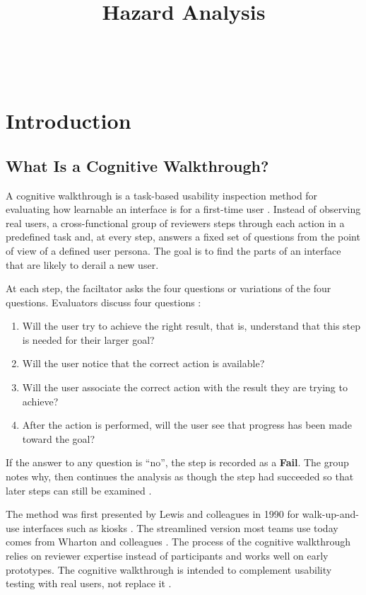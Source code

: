 \documentclass{article}
\title{Hazard Analysis\\\progname}
\author{\authname}
\date{}
\newcommand{\fail}{{\textbf{Fail}}}
\begin{document}
\maketitle
\thispagestyle{empty}

~\newpage
\tableofcontents
\newpage
\section{Introduction}

\subsection{What Is a Cognitive Walkthrough?}

A cognitive walkthrough is a task-based usability inspection method for evaluating how 
learnable an interface is for a first-time user \cite{nng-overview}. Instead of observing 
real users, a cross-functional group of reviewers steps through each action in a predefined 
task and, at every step, answers a fixed set of questions from the point of view of a 
defined user persona. The goal is to find the parts of an interface that are likely 
to derail a new user.

At each step, the faciltator asks the four questions or variations of the four questions. 
Evaluators discuss four questions \cite{nng-overview,nng-workshop}:
\begin{enumerate}
  \item Will the user try to achieve the right result, that is, understand that this step 
  is needed for their larger goal?
  \item Will the user notice that the correct action is available?
  \item Will the user associate the correct action with the result they are trying to 
  achieve?
  \item After the action is performed, will the user see that progress has been made 
  toward the goal?
\end{enumerate}
If the answer to any question is ``no'', the step is recorded as a \fail{}. The group notes 
why, then continues the analysis as though the step had succeeded so that later steps can 
still be examined \cite{nng-workshop}.

The method was first presented by Lewis and colleagues in 1990 for walk-up-and-use interfaces 
such as kiosks \cite{lewis1990}. The streamlined version most teams use today comes from Wharton 
and colleagues \cite{wharton1994}. The process of the cognitive walkthrough relies on reviewer 
expertise instead of participants and works well on early prototypes. The cognitive walkthrough 
is intended to complement usability testing with real users, not replace it \cite{nng-overview}.
\end{document}
